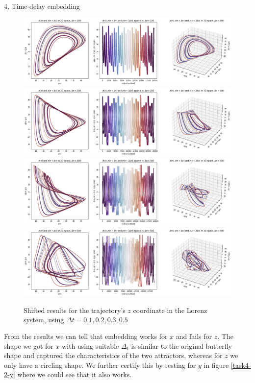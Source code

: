 \documentclass[10pt,a4paper]{article}
\begin{document}
\begin{task}{4, Time-delay embedding}
\begin{figure}[H]
    \centering
    \includegraphics[width=16cm]{images/task4-2-z-0.1.png}
    \includegraphics[width=16cm]{images/task4-2-z-0.2.png}
    \includegraphics[width=16cm]{images/task4-2-z-0.3.png}
    \includegraphics[width=16cm]{images/task4-2-z-0.5.png}
    \caption{Shifted results for the trajectory's $z$ coordinate in the Lorenz system, using $\Delta t=0.1, 0.2, 0.3, 0.5$}
    \label{task4-2-z}
\end{figure}

From the results we can tell that embedding works for $x$ and fails for $z$. The shape we got for $x$ with using suitable $\Delta_t$ is similar to the original butterfly shape and captured the characteristics of the two attractors, whereas for $z$ we only have a circling shape. We further certify this by testing for $y$ in figure \ref{task4-2-y} where we could see that it also works.


\end{task}
\end{document}
